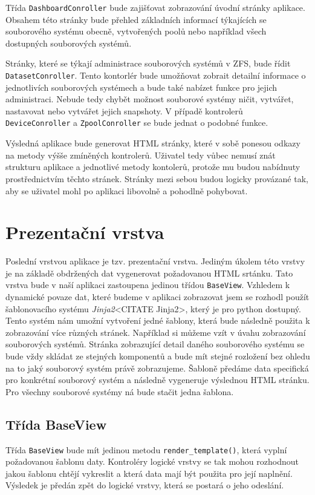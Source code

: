     Třída \verb|DashboardConroller| bude zajišťovat zobrazování úvodní stránky aplikace. Obsahem této stránky bude přehled základních informací týkajících se souborového systému obecně, vytvořených poolů nebo například všech dostupných souborových systémů.

    Stránky, které se týkají administrace souborových systémů v ZFS, bude řídit \verb|DatasetConroller|. Tento kontorlér bude umožňovat zobrait detailní informace o jednotlivích souborových systémech a bude také nabízet funkce pro jejich administraci. Nebude tedy chybět možnost souborové systémy ničit, vytvářet, nastavovat nebo vytvářet jejich snapshoty.
    V případě kontrolerů \verb|DeviceConroller| a \verb|ZpoolConroller| se bude jednat o podobné funkce.

    Výsledná aplikace bude generovat HTML stránky, které v sobě ponesou odkazy na metody výšše zmíněných kontrolerů. Uživatel tedy vůbec nemusí znát strukturu aplikace a jednotlivé metody kontolerů, protože mu budou nabídnuty prostřednictvím těchto stránek. Stránky mezi sebou budou logicky provázané tak, aby se uživatel mohl po aplikaci libovolně a pohodlně pohybovat.

\section{Prezentační vrstva}
Poslední vrstvou aplikace je tzv. prezentační vrstva. Jediným úkolem této vrstvy je na základě obdržených dat vygenerovat požadovanou HTML srtánku. Tato vrstva bude v naší aplikaci zastoupena jedinou třídou \verb|BaseView|. Vzhledem k dynamické povaze dat, které budeme v aplikaci zobrazovat jsem se rozhodl použít šablonovacího systému \emph{Jinja2}<CITATE Jinja2>, který je pro python dostupný. Tento systém nám umožní vytvoření jedné šablony, která bude následně použita k zobrazování více různých stránek. Například si můžeme vzít v úvahu zobrazování souborových systémů. Stránka zobrazující detail daného souborového systému se bude vždy skládat ze stejných komponentů a bude mít stejné rozložení bez ohledu na to jaký souborový systém právě zobrazujeme. Šabloně předáme data specifická pro konkrétní souborový systém a následně vygeneruje výslednou HTML stránku. Pro všechny souborové systémy ná bude stačit jedna šablona.
    \subsection{Třída BaseView}
    Třída \verb|BaseView| bude mít jedinou metodu \verb|render_template()|, která vyplní požadovanou šablonu daty. Kontroléry logické vrstvy se tak mohou rozhodnout jakou šablonu chtějí vykreslit a která data mají být použita pro její naplnění. Výsledek je předán zpět do logické vrstvy, která se postará o jeho odeslání.
